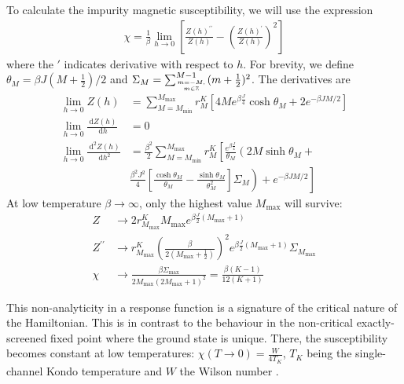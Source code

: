 \documentclass[reprint,prb,superscriptaddress]{revtex4-2}
\begin{document}
To calculate the impurity magnetic susceptibility, we will use the expression
\begin{align}
	\chi = \frac{1}{\beta}\lim_{h \to 0}\left[\frac{Z(h)^{\prime\prime}}{Z(h)} - \left(\frac{Z(h)^{\prime}}{Z(h)}\right)^2 \right] 
\end{align}
where the \(\prime\) indicates derivative with respect to \(h\). For brevity, we define \(\theta_M = \beta J (M+\frac{1}{2})/2\) and \(\Sigma_M = \sum_{m=-M, \atop{m\in \mathbb{Z}}}^{M-1}(m+\frac{1}{2})^2\). The derivatives are
\begin{align}
	\lim_{h \to 0}Z(h) &= \sum_{M=M_\text{min}}^{M_\text{max}}r^K_M\left[4Me^{\beta \frac{J}{4}}\cosh \theta_M + 2e^{-\beta JM/2}\right]\\
	\lim_{h \to 0}\frac{\:\mathrm{d}Z(h)}{\:\mathrm{d}h} &=  0\\
	\lim_{h \to 0}\frac{\:\mathrm{d}^2Z(h)}{\:\mathrm{d}h^2} &= \frac{\beta^2}{2}\sum_{M=M_\text{min}}^{M_\text{max}}r^K_M\left[\frac{e^{\beta \frac{J}{4}}}{\theta_M}\left(2M\sinh \theta_M + \right.\right.\nonumber\\
								 &\left.\left.\frac{\beta^2 J^2}{4}\left[\frac{\cosh\theta_M}{\theta_M} - \frac{\sinh \theta_M}{\theta_M^2}\right]\Sigma_M\right)+ e^{-\beta JM/2}\right]
\end{align}
At low temperature \(\beta \to \infty\), only the highest value \(M_\text{max}\) will survive:
\begin{align}
	Z &\to 2 r^K_{M_\text{max}} M_\text{max} e^{\beta \frac{J}{2}(M_\text{max} + 1)}\\
	Z^{\prime \prime} &\to r^K_{M_\text{max}}\left(\frac{\beta }{2(M_\text{max} + \frac{1}{2})}\right)^2 e^{\beta \frac{J}{2}(M_\text{max} + 1)}\Sigma_{M_\text{max}}\\
	\chi &\to \frac{\beta\Sigma_\text{max}}{2M_\text{max}\left(2M_\text{max}+1\right)^2} = \frac{\beta(K-1)}{12(K+1)}
\end{align}

This non-analyticity in a response function is a signature of the critical nature of the Hamiltonian. This is in contrast to the behaviour in the non-critical exactly-screened fixed point where the ground state is unique. There, the susceptibility becomes constant at low temperatures: \(\chi(T\to 0) = \frac{W}{4 T_K}\), \(T_K\) being the single-channel Kondo temperature and \(W\) the Wilson number \cite{wilson1975renormalization,nozieres1974fermi,bullaNRGreview,kondo_urg}.
\end{document}
